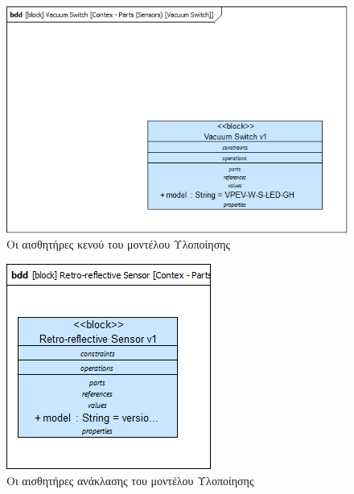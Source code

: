\documentclass[a4paper,12pt,twoside]{report}
\begin{document}
{\begin{appendices}
				\clearpage
				\begin{figure}[hp]
					\centering
					\includegraphics[scale=0.50]{DesignModel_Contex-Parts(Sensors)[VacuumSwitch].png}
					\caption{Οι αισθητήρες κενού του μοντέλου Υλοποίησης}
					\label{φωτ:Οι αισθητήρες κενού του μοντέλου Υλοποίησης}
				\end{figure}
				
				\begin{figure}[hp]
					\centering
					\includegraphics[scale=0.50]{DesignModel_Contex-Parts(Sensors)[Retro-reflectiveSensors].png}
					\caption{Οι αισθητήρες ανάκλασης του μοντέλου Υλοποίησης}
					\label{φωτ:Οι αισθητήρες ανάκλασης του μοντέλου Υλοποίησης}
				\end{figure}
				

\end{appendices}}
\end{document}
